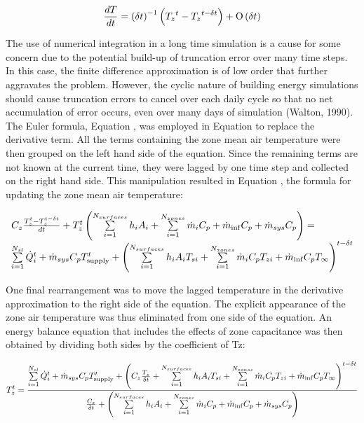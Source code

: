 \begin{equation}
\frac{{dT}}{{dt}} = {\left( {\delta t} \right)^{ - 1}}\left( {{T_z}^t - {T_z}^{t - \delta t}} \right) + {\rm O}\left( {\delta t} \right)
\end{equation}

The use of numerical integration in a long time simulation is a cause for some concern due to the potential build-up of truncation error over many time steps. In this case, the finite difference approximation is of low order that further aggravates the problem. However, the cyclic nature of building energy simulations should cause truncation errors to cancel over each daily cycle so that no net accumulation of error occurs, even over many days of simulation (Walton, 1990). The Euler formula, Equation , was employed in Equation to replace the derivative term. All the terms containing the zone mean air temperature were then grouped on the left hand side of the equation. Since the remaining terms are not known at the current time, they were lagged by one time step and collected on the right hand side. This manipulation resulted in Equation , the formula for updating the zone mean air temperature:

\begin{equation}
\begin{array}{l}{C_z}\frac{{T_z^t - T_z^{t - \delta t}}}{{dt}} + T_z^t\left( {\sum\limits_{i = 1}^{{N_{surfaces}}} {{h_i}} {A_i} + \sum\limits_{i = 1}^{{N_{zones}}} {{{\dot m}_i}} {C_p} + {{\dot m}_{\inf }}{C_p} + {{\dot m}_{sys}}{C_p}} \right) = \\\sum\limits_{i = 1}^{{N_{sl}}} {\dot Q_i^t}  + {{\dot m}_{sys}}{C_p}T_{{\rm{supply}}}^t + {\left( {\sum\limits_{i = 1}^{{N_{surfaces}}} {{h_i}} {A_i}{T_{si}} + \sum\limits_{i = 1}^{{N_{zones}}} {{{\dot m}_i}} {C_p}{T_{zi}} + {{\dot m}_{\inf }}{C_p}{T_\infty }} \right)^{t - \delta t}}\end{array}
\end{equation}

One final rearrangement was to move the lagged temperature in the derivative approximation to the right side of the equation. The explicit appearance of the zone air temperature was thus eliminated from one side of the equation. An energy balance equation that includes the effects of zone capacitance was then obtained by dividing both sides by the coefficient of Tz:

\begin{equation}
T_z^t = \frac{{\sum\limits_{i = 1}^{{N_{sl}}} {\dot Q_i^t}  + {{\dot m}_{sys}}{C_p}T_{{\rm{supply}}}^t + {{\left( {{C_z}\frac{{T_z^{}}}{{\delta t}} + \sum\limits_{i = 1}^{{N_{surfaces}}} {{h_i}} {A_i}{T_{si}} + \sum\limits_{i = 1}^{{N_{zones}}} {{{\dot m}_i}} {C_p}{T_{zi}} + {{\dot m}_{\inf }}{C_p}{T_\infty }} \right)}^{t - \delta t}}}}{{\frac{{{C_z}}}{{\delta t}} + \left( {\sum\limits_{i = 1}^{{N_{surfaces}}} {{h_i}} {A_i} + \sum\limits_{i = 1}^{{N_{zones}}} {{{\dot m}_i}} {C_p} + {{\dot m}_{\inf }}{C_p} + {{\dot m}_{sys}}{C_p}} \right)}}
\end{equation}

